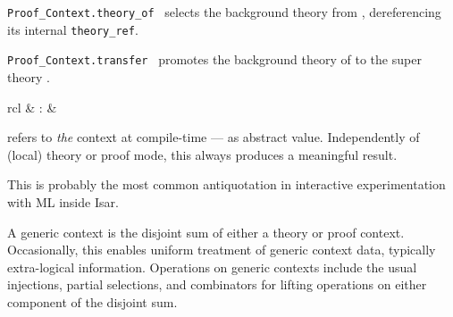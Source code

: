 \begin{isabellebody}
\begin{isamarkuptext}
\begin{description}
  \item \verb|Proof_Context.theory_of|~ selects the
  background theory from , dereferencing its internal
  \verb|theory_ref|.

  \item \verb|Proof_Context.transfer|~ promotes the
  background theory of  to the super theory .

  \end{description}%
\end{isamarkuptext}%
\isamarkuptrue%
%
\endisatagmlref
{\isafoldmlref}%
%
\isadelimmlref
%
\endisadelimmlref
%
\isadelimmlantiq
%
\endisadelimmlantiq
%
\isatagmlantiq
%
\begin{isamarkuptext}%
\begin{matharray}{rcl}
  \hypertarget{ML antiquotation.context}{\hyperlink{ML antiquotation.context}{\mbox{}}} & : &  \\
  \end{matharray}

  \begin{description}

  \item {} refers to \emph{the} context at
  compile-time --- as abstract value.  Independently of (local) theory
  or proof mode, this always produces a meaningful result.

  This is probably the most common antiquotation in interactive
  experimentation with ML inside Isar.

  \end{description}%
\end{isamarkuptext}%
\isamarkuptrue%
%
\endisatagmlantiq
{\isafoldmlantiq}%
%
\isadelimmlantiq
%
\endisadelimmlantiq
%
\isamarkuptrue%
%
\begin{isamarkuptext}%
A generic context is the disjoint sum of either a theory or proof
  context.  Occasionally, this enables uniform treatment of generic
  context data, typically extra-logical information.  Operations on
  generic contexts include the usual injections, partial selections,
  and combinators for lifting operations on either component of the
  disjoint sum.


\end{isamarkuptext}
\end{isabellebody}

